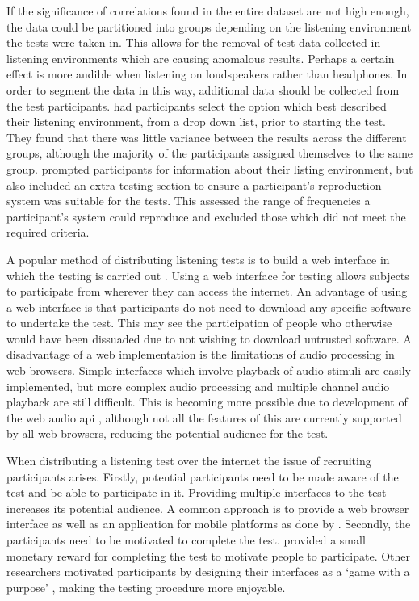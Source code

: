 			If the significance of correlations found in the entire dataset are not high enough, the data could
			be partitioned into groups depending on the listening environment the tests were taken in. This
			allows for the removal of test data collected in listening environments which are causing anomalous
			results. Perhaps a certain effect is more audible when listening on loudspeakers rather than
			headphones. In order to segment the data in this way, additional data should be collected from the
			test participants. \citet{wilmering2013audio} had participants select the option which best
			described their listening environment, from a drop down list, prior to starting the test. They
			found that there was little variance between the results across the different groups, although the
			majority of the participants assigned themselves to the same group.
			\citet{seetharaman2014crowdsourcing} prompted participants for information about their listing
			environment, but also included an extra testing section to ensure a participant's reproduction
			system was suitable for the tests. This assessed the range of frequencies a participant's system
			could reproduce and excluded those which did not meet the required criteria.
			
			A popular method of distributing listening tests is to build a web interface in which the testing
			is carried out \citep{wilmering2013audio, cartwright2013socialeq, seetharaman2014crowdsourcing}.
			Using a web interface for testing allows subjects to participate from wherever they can access the
			internet. An advantage of using a web interface is that participants do not need to download any
			specific software to undertake the test. This may see the participation of people who otherwise
			would have been dissuaded due to not wishing to download untrusted software. A disadvantage of a
			web implementation is the limitations of audio processing in web browsers. Simple interfaces which
			involve playback of audio stimuli are easily implemented, but more complex audio processing and
			multiple channel audio playback are still difficult. This is becoming more possible due to
			development of the web audio \acrshort{api} \citep{adenot2015web}, although not all the features of
			this are currently supported by all web browsers, reducing the potential audience for the test.

			When distributing a listening test over the internet the issue of recruiting participants arises.
			Firstly, potential participants need to be made aware of the test and be able to participate in it.
			Providing multiple interfaces to the test increases its potential audience. A common approach is to
			provide a web browser interface as well as an application for mobile platforms as done by
			\citet{huq2010crowdsourcing}. Secondly, the participants need to be motivated to complete the test.
			\citet{cartwright2013socialeq} provided a small monetary reward for completing the test to motivate
			people to participate. Other researchers motivated participants by designing their interfaces as a
			`game with a purpose' \citep{law2007tagatune, huq2010crowdsourcing, burgoyne2013hooked,
			wolff2014spot}, making the testing procedure more enjoyable.

